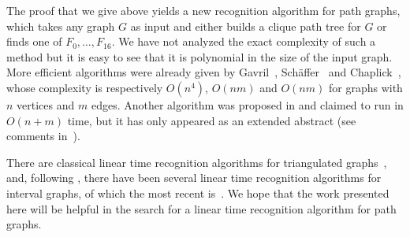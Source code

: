 \documentclass[11pt]{article}
\begin{document}
The proof that we give above yields a new recognition algorithm for
path graphs, which takes any graph $G$ as input and either builds a
clique path tree for $G$ or finds one of $F_0, \ldots, F_{16}$.  We
have not analyzed the exact complexity of such a method but it is easy
to see that it is polynomial in the size of the input graph.  More
efficient algorithms were already given by Gavril~\cite{Gav78},
Sch\"affer~\cite{Sch93} and Chaplick~\cite{Cha08}, whose complexity is
respectively $O(n^4)$, $O(nm)$ and $O(nm)$ for graphs with $n$
vertices and $m$ edges.  Another algorithm was proposed in
\cite{DahBai96} and claimed to run in $O(n+m)$ time, but it has only
appeared as an extended abstract (see comments in~\cite[Section
2.1.4]{Cha08}).

There are classical linear time recognition algorithms for
triangulated graphs~\cite{RTL76}, and, following \cite{BL76}, there
have been several linear time recognition algorithms for interval
graphs, of which the most recent is~\cite{HMPV}.  We hope that the
work presented here will be helpful in the search for a linear time
recognition algorithm for path graphs.
\end{document}
